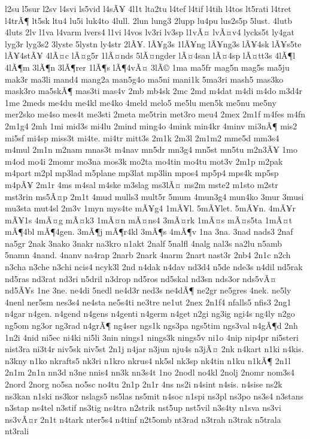 {l2su
l5sur
l2sv
l4svi
ls5vid
l4sÃ¥
4l1t
lta2tu
l4tef
l4tif
l4tih
l4tos
lt5rati
l4tret
l4trÃ¶
lt5sk
ltu4
lu5i
luk4to
4lull.
2lun
lung3
2lupp
lu4pu
lus2s5p
5lust.
4lutb
4luts
2lv
l1va
l4varm
lvers4
l1vi
l4vos
lv3ri
lv3sp
l1vÃ¤
lvÃ¤v4
lycks5t
ly4gat
lyg3r
lyg3s2
3lyste
5lystn
ly4str
2lÃ¥.
lÃ¥g3s
1lÃ¥ng
lÃ¥ng3s
lÃ¥4sk
lÃ¥s5te
lÃ¥4stÃ¥
4lÃ¤c
lÃ¤g5r
1lÃ¤nds
5lÃ¤ngder
lÃ¤4san
lÃ¤4sp
lÃ¤tt3s
4lÃ¶l
4lÃ¶m
3lÃ¶n
3lÃ¶rer
1lÃ¶s
lÃ¶4vÃ¤
3lÃ©
1ma
ma5fr
mag5n
mag5s
ma5ju
mak3r
ma3li
mand4
mang2a
man5g4o
ma5ni
mani1k
5ma3ri
mash5
mas3ko
mask3ro
ma5skÃ¶
mas3ti
mas4v
2mb
mb4sk
2mc
2md
m4dat
m4di
m4do
m3d4r
1me
2meds
me4du
me4kl
me4ko
4meld
melo5
me5lu
men5k
me5nu
me5ny
mer2sko
me4so
mes4t
me3sti
2meta
me5trin
met3ro
meu4
2mex
2m1f
m4fes
m4fn
2m1g4
2mh
1mi
mid3s
mi4lu
2mind
ming4o
4mink
min4kr
4minv
mi3nÃ¶
mis2
mi5sf
mi4sp
miss3t
mi4te.
mi4tr
mitt3s
2m1k
2m3l
2m1m2
mme5d
mm3s4
m4mul
2m1n
m2nam
mnas3t
m4nav
mn5dr
mn3g4
mn5st
mn5tu
m2n3Ã¥
1mo
m4od
mo4i
2momr
mo3na
mos3k
mo2ta
mo4tin
mo4tu
mot3v
2m1p
m2pak
m4part
m2pl
mp3lad
m5plane
mp3lat
mp3lin
mpos4
mp5p4
mps4k
mp5sp
m4pÃ¥
2m1r
4ms
m4sal
m4ske
m3slag
ms3lÃ¤
ms2m
mste2
m1sto
m2str
mst3rin
ms5Ã¤p
2m1t
4mud
mulls3
mult5r
5mum
4mun3g4
mun4ko
3mur
3musi
mu3sta
mut4sl
2m3v
1myn
mys4te
mÃ¥g4
1mÃ¥l.
5mÃ¥let.
5mÃ¥n.
4mÃ¥r
mÃ¥1s
4mÃ¤g
mÃ¤k3
1mÃ¤n
mÃ¤ns4
3mÃ¤rk
1mÃ¤s
mÃ¤s5ta
1mÃ¤t
mÃ¶4bl
mÃ¶4gen.
3mÃ¶j
mÃ¶r4kl
3mÃ¶s
4mÃ¶v
1na
3na.
3nad
nads3
2naf
na5gr
2nak
3nako
3nakr
na3kro
n1akt
2nalf
5nalfl
4nalg
nal3s
na2lu
n5amb
5namn
4nand.
4nanv
na4rap
2narb
2nark
4narm
2nart
nast3r
2nb4
2n1c
n2ch
n3cha
n3che
n3chi
ncis4
ncyk3l
2nd
n4dak
n4dav
nd3d4
n5de
nde3s
n4dil
nd5rak
nd5ras
nd3rat
nd3ri
n5dril
n3drop
nd5ros
nd5skal
nd3sn
nds3or
nds5vÃ¤
nd5Ã¥s
1ne
3ne.
ne4di
5nedl
ne4d3r
ned3s
ne4dÃ¶
ne2gr
ne5gres
4nek.
ne5ly
4nenl
ner5sm
nes3s4
ne4sta
ne5s4ti
ne3tre
ne1ut
2nex
2n1f4
nfalls5
nfis3
2ng1
n4gar
n4gen.
n4gend
n4gens
n4genti
n4germ
n4get
n2gi
ng3ig
ngi4s
ng4ly
n2go
ng5om
ng3or
ng3rad
n4grÃ¶
ng4ser
ngs1k
ngs3pa
ngs5tim
ngs3val
n4gÃ¶d
2nh
1n2i
4nid
ni5ec
ni4ki
ni5li
3nin
nings1
nings3k
nings5v
ni1o
4nip
nip4pr
ni5steri
nist3ra
ni3t4r
niv5sk
niv5st
2n1j
n4jar
n3jun
nju4s
n3jÃ¤
2nk
n4kart
n1ki
n4kis.
n3kny
n1ko
nkrafts5
nk3ri
n1kro
nkrus4
nk5sl
nk3sp
nk4tin
n1ku
n1kÃ¶
2n1l
2n1m
2n1n
nn3d
n3ne
nnis4
nn3k
nn3s4t
1no
2nodl
no4kl
2nolj
2nomr
nom3s4
2nord
2norg
no5sa
no5sc
no4tu
2n1p
2n1r
4ns
ns2i
n4sint
n4sis.
n4sise
ns2k
ns3kan
n1ski
ns3kor
nslags5
ns5las
ns5mit
n4soc
n1spi
ns3pl
ns3po
ns3s4
n3stans
n3stap
ns4tel
n3stif
ns3tig
ns4tra
n2strik
nst5up
nst5vil
n3s4ty
n1sva
ns3vi
ns3vÃ¤r
2n1t
n4tark
nter5s4
n4tinf
n2t5omb
nt3rad
n3trah
n3trak
n5trala
nt3rali
}
